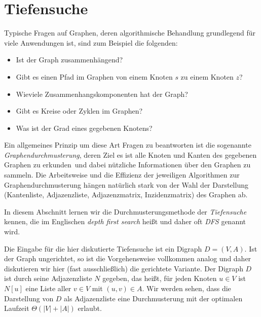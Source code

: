 \section{Tiefensuche}
\label{sect:tiefensuche}

\begin{bem}
Typische Fragen auf Graphen, deren algorithmische Behandlung grundlegend für viele Anwendungen ist, sind zum Beispiel die folgenden:
\begin{itemize}
 \item Ist der Graph zusammenhängend?
 \item Gibt es einen Pfad im Graphen von einem Knoten $s$ zu einem Knoten $z$?
 \item Wieviele Zusammenhangskomponenten hat der Graph?
 \item Gibt es Kreise oder Zyklen im Graphen?
 \item Was ist der Grad eines gegebenen Knotens?
\end{itemize}

Ein allgemeines Prinzip um diese Art Fragen zu beantworten ist die sogenannte \emph{Graphendurchmusterung}, deren Ziel es ist alle Knoten und Kanten des gegebenen Graphen zu \glqq erkunden\grqq\ und dabei nützliche Informationen über den Graphen zu sammeln.
Die Arbeitsweise und die Effizienz der jeweiligen Algorithmen zur Graphendurchmusterung hängen natürlich stark von der Wahl der Darstellung (Kantenliste, Adjazenzliste, Adjazenzmatrix, Inzidenzmatrix) des Graphen ab.

\end{bem} 

\begin{bem} 
In diesem Abschnitt lernen wir die Durchmusterungsmethode der \emph{Tiefensuche} kennen, die im Englischen \emph{depth first search} heißt und daher oft \emph{DFS} genannt wird.

Die Eingabe für die hier diskutierte Tiefensuche ist ein Digraph $D=(V,A)$.
Ist der Graph ungerichtet, so ist die Vorgehensweise vollkommen analog und daher diskutieren wir hier (fast ausschließlich) die gerichtete Variante.
Der Digraph $D$ ist durch seine Adjazenzliste $N$ gegeben, das heißt, für jeden Knoten $u \in V$ ist $N[u]$ eine Liste aller $v \in V$ mit $(u,v) \in A$.
Wir werden sehen, dass die Darstellung von $D$ als Adjazenzliste eine Durchmusterung mit der optimalen Laufzeit $\Theta(|V|+|A|)$ erlaubt.
\end{bem}

